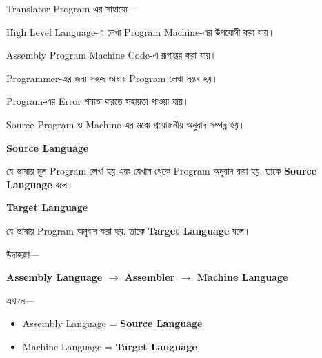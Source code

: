 Translator Program-এর সাহায্যে—

\begin{compacttwocolpoints}

\item High Level Language-এ লেখা Program Machine-এর উপযোগী করা যায়।

\item Assembly Program Machine Code-এ রূপান্তর করা যায়।

\item Programmer-এর জন্য সহজ ভাষায় Program লেখা সম্ভব হয়।

\item Program-এর Error শনাক্ত করতে সহায়তা পাওয়া যায়।

\item Source Program ও Machine-এর মধ্যে প্রয়োজনীয় অনুবাদ সম্পন্ন হয়।

\end{compacttwocolpoints}


\begin{definitionbox}

\textbf{\color{darkTeal}Source Language}

যে ভাষায় মূল Program লেখা হয় এবং যেখান থেকে Program অনুবাদ করা হয়,
তাকে \textbf{Source Language} বলে।

\medskip

\textbf{\color{darkTeal}Target Language}

যে ভাষায় Program অনুবাদ করা হয়, তাকে
\textbf{Target Language} বলে।

\end{definitionbox}

উদাহরণ—

\begin{center}

\textbf{
Assembly Language
\(\longrightarrow\)
Assembler
\(\longrightarrow\)
Machine Language
}

\end{center}

এখানে—

\begin{itemize}

\item Assembly Language = \textbf{Source Language}

\item Machine Language = \textbf{Target Language}

\end{itemize}

